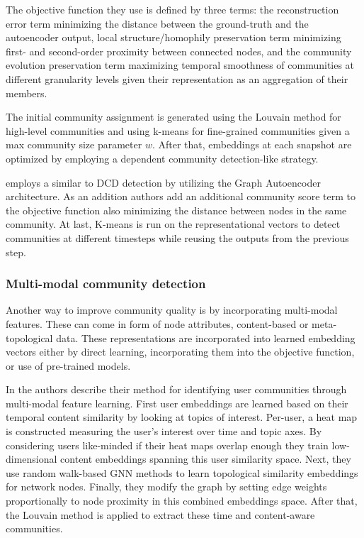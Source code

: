 \documentclass[
acmsmall,
nonacm,
screen,
acmthm]{../../scripts/pandoc/templates/acmart}
\begin{document}
The objective function they use is defined by three terms: the
reconstruction error term minimizing the distance between the
ground-truth and the autoencoder output, local structure/homophily
preservation term minimizing first- and second-order proximity between
connected nodes, and the community evolution preservation term
maximizing temporal smoothness of communities at different granularity
levels given their representation as an aggregation of their members.

The initial community assignment is generated using the Louvain method
for high-level communities and using k-means for fine-grained
communities given a max community size parameter \(w\). After that,
embeddings at each snapshot are optimized by employing a dependent
community detection-like strategy.

\citet{wangEvolutionaryAutoencoderDynamic2020} employs a similar to DCD
detection by utilizing the Graph Autoencoder architecture. As an
addition authors add an additional community score term to the objective
function also minimizing the distance between nodes in the same
community. At last, K-means is run on the representational vectors to
detect communities at different timesteps while reusing the outputs from
the previous step.

\hypertarget{multi-modal-community-detection}{%
\subsubsection{Multi-modal community
detection}\label{multi-modal-community-detection}}

Another way to improve community quality is by incorporating multi-modal
features. These can come in form of node attributes, content-based or
meta-topological data. These representations are incorporated into
learned embedding vectors either by direct learning, incorporating them
into the objective function, or use of pre-trained models.

In \citet{faniUserCommunityDetection2020} the authors describe their
method for identifying user communities through multi-modal feature
learning. First user embeddings are learned based on their temporal
content similarity by looking at topics of interest. Per-user, a heat
map is constructed measuring the user's interest over time and topic
axes. By considering users like-minded if their heat maps overlap enough
they train low-dimensional content embeddings spanning this user
similarity space. Next, they use random walk-based GNN methods to learn
topological similarity embeddings for network nodes. Finally, they
modify the graph by setting edge weights proportionally to node
proximity in this combined embeddings space. After that, the Louvain
method is applied to extract these time and content-aware communities.
\end{document}
